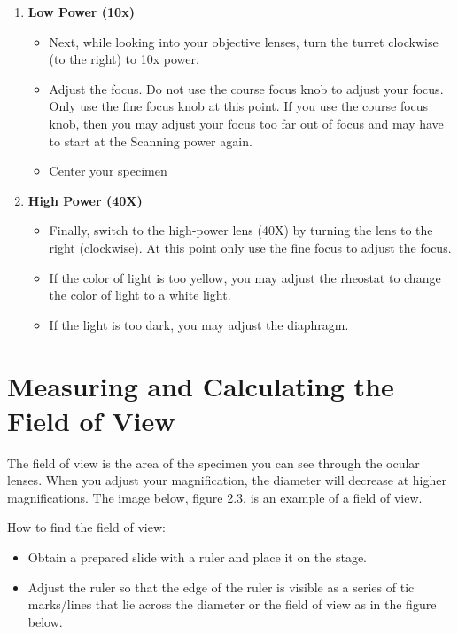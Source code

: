 \documentclass[
  letterpaper,
  DIV=11,
  numbers=noendperiod]{scrreprt}
\begin{document}
\begin{enumerate}
\def\labelenumi{\arabic{enumi}.}
\setcounter{enumi}{1}
\item
  \textbf{Low Power (10x)}

  \begin{itemize}
  \item
    Next, while looking into your objective lenses, turn the turret
    clockwise (to the right) to 10x power.
  \item
    Adjust the focus. Do not use the course focus knob to adjust your
    focus. Only use the fine focus knob at this point. If you use the
    course focus knob, then you may adjust your focus too far out of
    focus and may have to start at the Scanning power again.
  \item
    Center your specimen
  \end{itemize}
\item
  \textbf{High Power (40X)}

  \begin{itemize}
  \item
    Finally, switch to the high-power lens (40X) by turning the lens to
    the right (clockwise). At this point only use the fine focus to
    adjust the focus.
  \item
    If the color of light is too yellow, you may adjust the rheostat to
    change the color of light to a white light.
  \item
    If the light is too dark, you may adjust the diaphragm.
  \end{itemize}
\end{enumerate}

\section{\texorpdfstring{\textbf{Measuring and Calculating the Field of
View}}{Measuring and Calculating the Field of View}}\label{measuring-and-calculating-the-field-of-view}

The field of view is the area of the specimen you can see through the
ocular lenses. When you adjust your magnification, the diameter will
decrease at higher magnifications. The image below, figure 2.3, is an
example of a field of view.

How to find the field of view:

\begin{itemize}
\item
  Obtain a prepared slide with a ruler and place it on the stage.
\item
  Adjust the ruler so that the edge of the ruler is visible as a series
  of tic marks/lines that lie across the diameter or the field of view
  as in the figure below.
\end{itemize}
\end{document}
